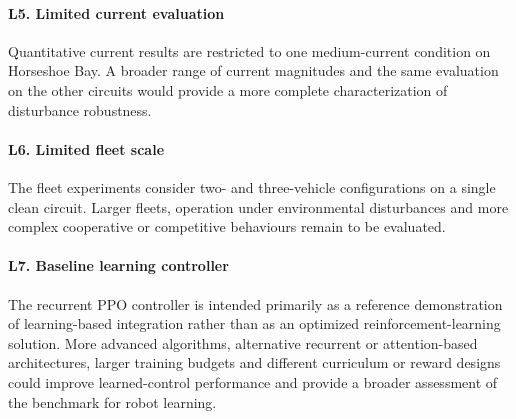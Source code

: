 \paragraph{L5. Limited current evaluation}
Quantitative current results are restricted to one medium-current condition on
Horseshoe Bay. A broader range of current magnitudes and the same evaluation on
the other circuits would provide a more complete characterization of disturbance
robustness.

\paragraph{L6. Limited fleet scale}
The fleet experiments consider two- and three-vehicle configurations on a single
clean circuit. Larger fleets, operation under environmental disturbances and
more complex cooperative or competitive behaviours remain to be evaluated.

\paragraph{L7. Baseline learning controller}
The recurrent PPO controller is intended primarily as a reference demonstration
of learning-based integration rather than as an optimized reinforcement-learning
solution. More advanced algorithms, alternative recurrent or attention-based
architectures, larger training budgets and different curriculum or reward
designs could improve learned-control performance and provide a broader
assessment of the benchmark for robot learning.

